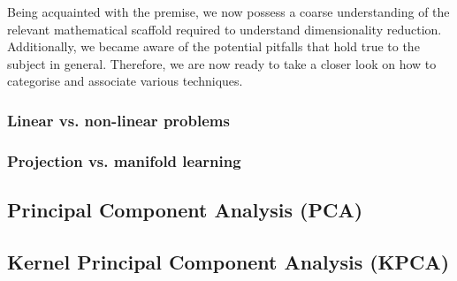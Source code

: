 Being acquainted with the premise, we now possess a coarse understanding of the relevant mathematical scaffold required to understand dimensionality reduction.
Additionally, we became aware of the potential pitfalls that hold true to the subject in general.
Therefore, we are now ready to take a closer look on how to categorise and associate various techniques.

\subsubsection{Linear vs. non-linear problems}

\clearpage

\subsubsection{Projection vs. manifold learning}

\clearpage




\subsection{Principal Component Analysis (PCA)}


\clearpage




\subsection{Kernel Principal Component Analysis (KPCA)}

\clearpage

